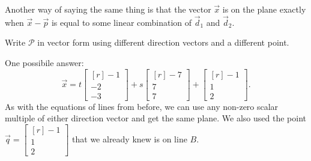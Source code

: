 \documentclass{problemset}
\newcommand{\mat}[1]{\begin{bmatrix*}[r]#1\end{bmatrix*}}
\begin{document}
\begin{parts}
\begin{solution}
				Another way of saying 
				the same thing is that the vector $\vec x$ is on the plane
				exactly when $\vec x - \vec p$ is equal	to some linear 
				combination of $\vec d_1$ and $\vec d_2$.
			\end{solution}
		\item Write $\mathcal P$ in vector form using different
			direction vectors and a different point.
			\begin{solution}
				One possibile answer:
				\[
					\vec x = t\mat{-1\\-2\\-3}+s\mat{-7\\7\\7}+\mat{-1\\1\\2}.
				\]
				As with the equations of lines from before, we can use any 
				non-zero scalar multiple of either direction vector and get the 
				same plane. We also used the point $\vec q = \mat{-1\\1\\2}$ 
				that we already knew is on line $B$. 
			\end{solution}
	\end{parts}
\end{document}
